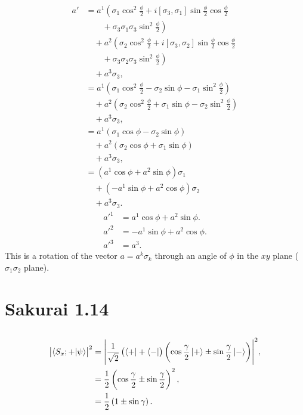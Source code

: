 \documentclass[
a4paper,
10pt,
twoside,
]{article}
\begin{document}
\begin{align}
	a' &= a^1 \left(\sigma_1\cos^2\frac{\phi}{2} + i[\sigma_3,\sigma_1] \sin\frac{\phi}{2}\cos\frac{\phi}{2}\right.\nonumber\\
	&\qquad+ \left. \sigma_3\sigma_1\sigma_3 \sin^2 \frac{\phi}{2} \right)\nonumber\\
	&\quad+ a^2 \left(\sigma_2\cos^2\frac{\phi}{2} + i[\sigma_3,\sigma_2] \sin\frac{\phi}{2}\cos\frac{\phi}{2}\right.\nonumber\\
	&\qquad+ \left. \sigma_3\sigma_2\sigma_3 \sin^2 \frac{\phi}{2} \right)\nonumber\\
	&\quad+ a^3\sigma_3,\\
	&= a^1 \left(\sigma_1\cos^2\frac{\phi}{2} - \sigma_2 \sin\phi - \sigma_1 \sin^2 \frac{\phi}{2} \right)\nonumber\\
	&\quad+ a^2 \left(\sigma_2\cos^2\frac{\phi}{2} + \sigma_1 \sin\phi - \sigma_2 \sin^2 \frac{\phi}{2} \right)\nonumber\\
	&\quad+ a^3\sigma_3,\\
	&= a^1 \left(\sigma_1\cos\phi - \sigma_2 \sin\phi\right)\nonumber\\
	&\quad+ a^2 \left(\sigma_2\cos\phi + \sigma_1 \sin\phi\right)\nonumber\\
	&\quad+ a^3\sigma_3,\\
	&= (a^1\cos\phi + a^2 \sin\phi)\sigma_1 \nonumber\\
	&\quad+ (-a^1\sin\phi + a^2\cos\phi) \sigma_2 \nonumber\\
	&\quad+ a^3\sigma_3.
\end{align}
\begin{align}
	a'^1 &= a^1\cos\phi + a^2 \sin\phi.\\
	a'^2 &= -a^1\sin\phi + a^2\cos\phi.\\
	a'^3 &= a^3.
\end{align}
This is a rotation of the vector $a = a^k\sigma_k$ through an angle of $\phi$ in the $xy$ plane ($\sigma_1\sigma_2$ plane).
\section{Sakurai 1.14}
\subsection{} %
\begin{align}
	\abs{\ip{S_x;+}{\psi}}^2 &= \abs{\frac{1}{\sqrt{2}}\left(\bra{+}+\bra{-}\right) \left( \cos\frac{\gamma}{2}\ket{+} \pm \sin\frac{\gamma}{2} \ket{-} \right)}^2,\\
	&= \frac{1}{2}\left(\cos\frac{\gamma}{2} \pm \sin\frac{\gamma}{2}\right)^2,\\
	&= \frac{1}{2}\left(1 \pm \sin\gamma \right).
\end{align}
\end{document}
